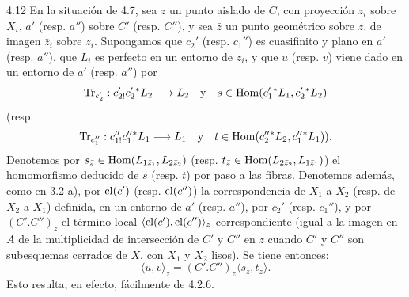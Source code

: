 \begin{statement}{4.12}
En la situación de 4.7, sea $z$ un punto aislado de $C$, con proyección $z_i$ sobre $X_i$, $a'$ (resp. $a''$) sobre $C'$ (resp. $C''$), y sea $\bar z$ un punto geométrico sobre $z$, de imagen $\bar z_i$ sobre $z_i$. Supongamos que $c_2'$ (resp. $c_1''$) es cuasifinito y plano en $a'$ (resp. $a''$), que $L_i$ es perfecto en un entorno de $z_i$, y que $u$ (resp. $v$) viene dado en un entorno de $a'$ (resp. $a''$) por
\[
\operatorname{Tr}_{c_2'}:c_{2!}'c_2'{}^*L_2\longrightarrow L_2
\quad\text{y}\quad
s\in\operatorname{Hom}(c_1'{}^*L_1,c_2'{}^*L_2)
\]
(resp.
\[
\operatorname{Tr}_{c_1''}:c_{1!}''c_1''{}^*L_1\longrightarrow L_1
\quad\text{y}\quad
t\in\operatorname{Hom}(c_2''{}^*L_2,c_1''{}^*L_1)).
\]
Denotemos por $s_{\bar z}\in\operatorname{Hom}(L_{1\bar z_1},L_{2\bar z_2})$ (resp. $t_{\bar z}\in\operatorname{Hom}(L_{2\bar z_2},L_{1\bar z_1})$) el homomorfismo deducido de $s$ (resp. $t$) por paso a las fibras. Denotemos además, como en 3.2 a), por $\operatorname{cl}(c')$ (resp. $\operatorname{cl}(c'')$) la correspondencia de $X_1$ a $X_2$ (resp. de $X_2$ a $X_1$) definida, en un entorno de $a'$ (resp. $a''$), por $c_2'$ (resp. $c_1''$), y por $(C'.C'')_z$ el término local $\langle\operatorname{cl}(c'),\operatorname{cl}(c'')\rangle_z$ correspondiente (igual a la imagen en $A$ de la multiplicidad de intersección de $C'$ y $C''$ en $z$ cuando $C'$ y $C''$ son subesquemas cerrados de $X$, con $X_1$ y $X_2$ lisos). Se tiene entonces:
\begin{equation}
\tag{4.12.1}
\langle u,v\rangle_z=(C'.C'')_z\langle s_{\bar z},t_{\bar z}\rangle.
\end{equation}
Esto resulta, en efecto, fácilmente de 4.2.6.
\end{statement}

